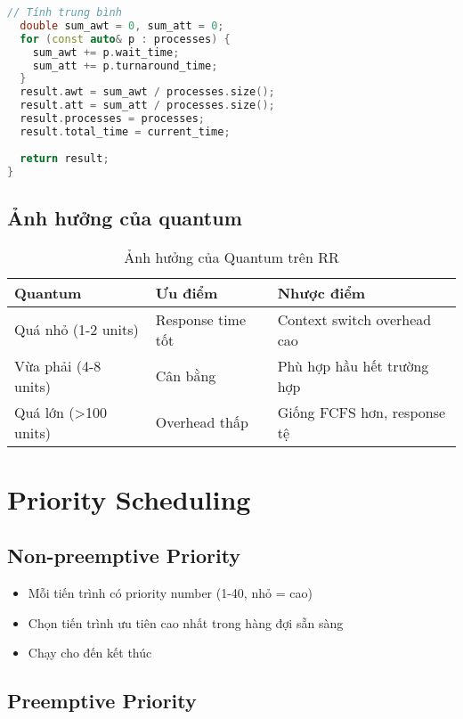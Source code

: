 \begin{lstlisting}[language=C++,caption={Cài đặt Round Robin}]
  // Tính trung bình
  double sum_awt = 0, sum_att = 0;
  for (const auto& p : processes) {
    sum_awt += p.wait_time;
    sum_att += p.turnaround_time;
  }
  result.awt = sum_awt / processes.size();
  result.att = sum_att / processes.size();
  result.processes = processes;
  result.total_time = current_time;
  
  return result;
}
\end{lstlisting}

\subsection{Ảnh hưởng của quantum}

\begin{table}[H]
\centering
\caption{Ảnh hưởng của Quantum trên RR}
\begin{tabular}{lll}
\toprule
\textbf{Quantum} & \textbf{Ưu điểm} & \textbf{Nhược điểm} \\
\midrule
Quá nhỏ (1-2 units) & Response time tốt & Context switch overhead cao \\
Vừa phải (4-8 units) & Cân bằng & Phù hợp hầu hết trường hợp \\
Quá lớn (>100 units) & Overhead thấp & Giống FCFS hơn, response tệ \\
\bottomrule
\end{tabular}
\label{tab:quantum_effect}
\end{table}

\section{Priority Scheduling}

\subsection{Non-preemptive Priority}

\begin{itemize}[leftmargin=1.5cm]
  \item Mỗi tiến trình có priority number (1-40, nhỏ = cao)
  \item Chọn tiến trình ưu tiên cao nhất trong hàng đợi sẵn sàng
  \item Chạy cho đến kết thúc
\end{itemize}

\subsection{Preemptive Priority}

